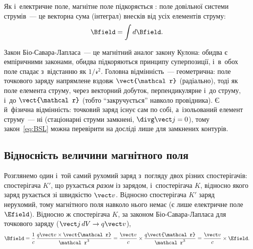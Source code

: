 Як і~електричне поле, магнітне поле підкоряється : поле
довільної системи струмів~--- це векторна сума (інтеграл) внесків від усіх елементів
струму:
\begin{equation}\label{eq:Superposition}
	\Bfield = \int d\Bfield.
\end{equation}

\begin{Attention}
	Закон Біо-Савара-Лапласа~--- це магнітний аналог закону Кулона: обидва є емпіричними
	законами, обидва підкоряються принципу суперпозиції, і~в~обох поле спадає з~відстанню
	як $1/\mathcal r^2$. Головна відмінність~--- геометрична: поле точкового заряду
	напрямлене вздовж $\vect{\mathcal r}$ (радіально), тоді як поле елемента струму, через
	векторний добуток, перпендикулярне і~до струму, і~до $\vect{\mathcal r}$ (тобто
	\enquote{закручується} навколо провідника). Є й~фізична відмінність: точковий заряд
	існує сам по собі, а~ізольований елемент струму~--- ні (стаціонарні струми замкнені,
	$\divg\vect j = 0$), тому закон~\eqref{eq:BSL} можна перевірити на досліді лише для
	замкнених контурів.
\end{Attention}


\subsection*{Відносність величини магнітного поля}


Розглянемо один і~той самий рухомий заряд з~погляду двох різних спостерігачів:
спостерігача $K'$, що рухається \emph{разом} із зарядом, і~спостерігача $K$, відносно
якого заряд рухається зі швидкістю $\vect v$. Відносно спостерігача $K'$ заряд нерухомий,
тому магнітного поля навколо нього немає (є лише електричне поле $\Efield$). Відносно ж
спостерігача $K$, за законом Біо-Савара-Лапласа для точкового заряду ($\vect j\, dV \to
	q\vect v$),
\begin{equation}\label{eq:BFromBprimeM}
	\Bfield = \frac1c\, \frac{q\vect v\times\vect{\mathcal r}}{\mathcal r^3} = \frac{\vect v}{c}\times \frac{q\vect{\mathcal r}}{\mathcal r^3} =
	\frac{\vect v}{c}\times\Efield.
\end{equation}

